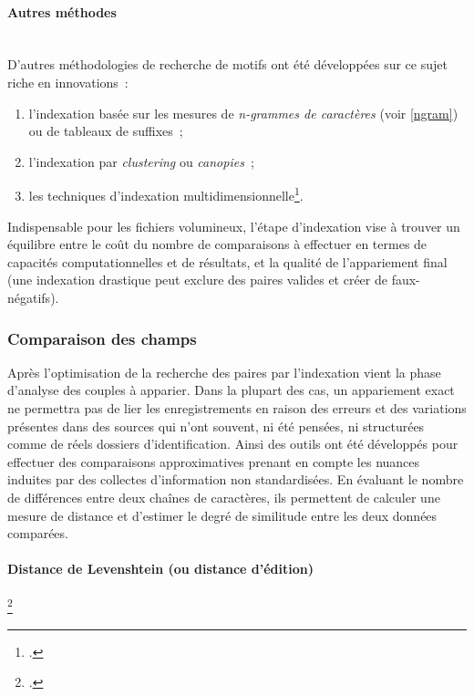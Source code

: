 \documentclass[a4paper,12pt,twoside]{book}
\begin{document}
			    \paragraph{Autres méthodes}\mbox{} \\
			    
			    D'autres méthodologies de recherche de motifs ont été développées sur ce sujet riche en innovations~:
			    \begin{enumerate}
			        \item l'indexation basée sur les mesures de \textit{n-grammes de caractères} (voir \ref{ngram}) ou de tableaux de suffixes~;
			        \item l'indexation par \textit{clustering} ou \textit{canopies}~;
			        \item les techniques d'indexation multidimensionnelle\footcite{kouahlaIndexationDansEspaces2013}.
			     \end{enumerate}
			   
			    Indispensable pour les fichiers volumineux, l'étape d’indexation vise à trouver un équilibre entre le coût du nombre de comparaisons à effectuer en termes de capacités computationnelles et de résultats, et la qualité de l’appariement final (une indexation drastique peut exclure des paires valides et créer de faux-négatifs).
			    
			    \subsubsection{Comparaison des champs}
			    \label{similarite}
			    Après l'optimisation de la recherche des paires par l'indexation vient la phase d'analyse des couples à apparier.
			    Dans la plupart des cas, un appariement exact ne permettra pas de lier les enregistrements en raison des erreurs et des variations présentes dans des sources qui n'ont souvent, ni été pensées, ni structurées comme de réels dossiers d'identification.
			    Ainsi des outils ont été développés pour effectuer des comparaisons approximatives prenant en compte les nuances induites par des collectes d'information non standardisées.
			    En évaluant le nombre de différences entre deux chaînes de caractères, ils permettent de calculer une mesure de distance et d'estimer le degré de similitude entre les deux données comparées.
			    
			    \paragraph{Distance de Levenshtein (ou distance d'édition)}\footcite{DistanceLevenshtein2022}\\
			    
\end{document}
